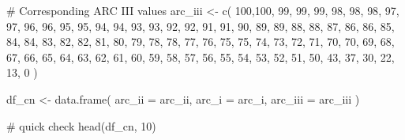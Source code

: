 \documentclass[
  letterpaper,
  DIV=11,
  numbers=noendperiod]{scrartcl}
\newenvironment{Shaded}{\begin{snugshade}}{\end{snugshade}}
\newcommand{\AttributeTok}[1]{\textcolor[rgb]{0.40,0.45,0.13}{#1}}
\newcommand{\CommentTok}[1]{\textcolor[rgb]{0.37,0.37,0.37}{#1}}
\newcommand{\DecValTok}[1]{\textcolor[rgb]{0.68,0.00,0.00}{#1}}
\newcommand{\FunctionTok}[1]{\textcolor[rgb]{0.28,0.35,0.67}{#1}}
\newcommand{\NormalTok}[1]{\textcolor[rgb]{0.00,0.23,0.31}{#1}}
\newcommand{\OtherTok}[1]{\textcolor[rgb]{0.00,0.23,0.31}{#1}}
\begin{document}
\begin{Shaded}
\begin{Highlighting}[]
\CommentTok{\# Corresponding ARC III values}
\NormalTok{arc\_iii }\OtherTok{\textless{}{-}} \FunctionTok{c}\NormalTok{(}
  \DecValTok{100}\NormalTok{,}\DecValTok{100}\NormalTok{, }\DecValTok{99}\NormalTok{, }\DecValTok{99}\NormalTok{, }\DecValTok{99}\NormalTok{, }\DecValTok{98}\NormalTok{, }\DecValTok{98}\NormalTok{, }\DecValTok{98}\NormalTok{, }\DecValTok{97}\NormalTok{, }\DecValTok{97}\NormalTok{,}
   \DecValTok{96}\NormalTok{, }\DecValTok{96}\NormalTok{, }\DecValTok{95}\NormalTok{, }\DecValTok{95}\NormalTok{, }\DecValTok{94}\NormalTok{, }\DecValTok{94}\NormalTok{, }\DecValTok{93}\NormalTok{, }\DecValTok{93}\NormalTok{, }\DecValTok{92}\NormalTok{, }\DecValTok{92}\NormalTok{,}
   \DecValTok{91}\NormalTok{, }\DecValTok{91}\NormalTok{, }\DecValTok{90}\NormalTok{, }\DecValTok{89}\NormalTok{, }\DecValTok{89}\NormalTok{, }\DecValTok{88}\NormalTok{, }\DecValTok{88}\NormalTok{, }\DecValTok{87}\NormalTok{, }\DecValTok{86}\NormalTok{, }\DecValTok{86}\NormalTok{,}
   \DecValTok{85}\NormalTok{, }\DecValTok{84}\NormalTok{, }\DecValTok{84}\NormalTok{, }\DecValTok{83}\NormalTok{, }\DecValTok{82}\NormalTok{, }\DecValTok{82}\NormalTok{, }\DecValTok{81}\NormalTok{, }\DecValTok{80}\NormalTok{, }\DecValTok{79}\NormalTok{, }\DecValTok{78}\NormalTok{,}
   \DecValTok{78}\NormalTok{, }\DecValTok{77}\NormalTok{, }\DecValTok{76}\NormalTok{, }\DecValTok{75}\NormalTok{, }\DecValTok{75}\NormalTok{, }\DecValTok{74}\NormalTok{, }\DecValTok{73}\NormalTok{, }\DecValTok{72}\NormalTok{, }\DecValTok{71}\NormalTok{, }\DecValTok{70}\NormalTok{,}
   \DecValTok{70}\NormalTok{, }\DecValTok{69}\NormalTok{, }\DecValTok{68}\NormalTok{, }\DecValTok{67}\NormalTok{, }\DecValTok{66}\NormalTok{, }\DecValTok{65}\NormalTok{, }\DecValTok{64}\NormalTok{, }\DecValTok{63}\NormalTok{, }\DecValTok{62}\NormalTok{, }\DecValTok{61}\NormalTok{,}
   \DecValTok{60}\NormalTok{, }\DecValTok{59}\NormalTok{, }\DecValTok{58}\NormalTok{, }\DecValTok{57}\NormalTok{, }\DecValTok{56}\NormalTok{, }\DecValTok{55}\NormalTok{, }\DecValTok{54}\NormalTok{, }\DecValTok{53}\NormalTok{, }\DecValTok{52}\NormalTok{, }\DecValTok{51}\NormalTok{,}
   \DecValTok{50}\NormalTok{, }\DecValTok{43}\NormalTok{, }\DecValTok{37}\NormalTok{, }\DecValTok{30}\NormalTok{, }\DecValTok{22}\NormalTok{, }\DecValTok{13}\NormalTok{,  }\DecValTok{0}
\NormalTok{)}

\NormalTok{df\_cn }\OtherTok{\textless{}{-}} \FunctionTok{data.frame}\NormalTok{(}
  \AttributeTok{arc\_ii =}\NormalTok{ arc\_ii,}
  \AttributeTok{arc\_i =}\NormalTok{ arc\_i,}
  \AttributeTok{arc\_iii =}\NormalTok{ arc\_iii}
\NormalTok{)}

\CommentTok{\# quick check}
\FunctionTok{head}\NormalTok{(df\_cn, }\DecValTok{10}\NormalTok{)}
\end{Highlighting}
\end{Shaded}
\end{document}
